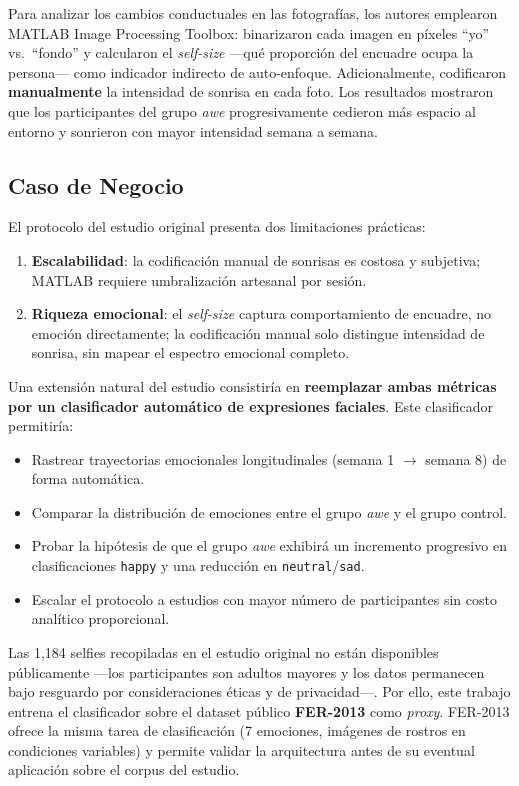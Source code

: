 \documentclass[12pt, a4paper]{article}
\begin{document}
Para analizar los cambios conductuales en las fotografías, los autores emplearon MATLAB Image
Processing Toolbox: binarizaron cada imagen en píxeles ``yo'' vs.\ ``fondo'' y calcularon el
\textit{self-size} —qué proporción del encuadre ocupa la persona— como indicador indirecto de
auto-enfoque. Adicionalmente, codificaron \textbf{manualmente} la intensidad de sonrisa en cada
foto. Los resultados mostraron que los participantes del grupo \textit{awe} progresivamente
cedieron más espacio al entorno y sonrieron con mayor intensidad semana a semana.

\subsection{Caso de Negocio}

El protocolo del estudio original presenta dos limitaciones prácticas:

\begin{enumerate}
  \item \textbf{Escalabilidad}: la codificación manual de sonrisas es costosa y subjetiva;
        MATLAB requiere umbralización artesanal por sesión.
  \item \textbf{Riqueza emocional}: el \textit{self-size} captura comportamiento de encuadre,
        no emoción directamente; la codificación manual solo distingue intensidad de sonrisa,
        sin mapear el espectro emocional completo.
\end{enumerate}

Una extensión natural del estudio consistiría en \textbf{reemplazar ambas métricas por un
clasificador automático de expresiones faciales}. Este clasificador permitiría:

\begin{itemize}
  \item Rastrear trayectorias emocionales longitudinales (semana 1 $\to$ semana 8) de forma automática.
  \item Comparar la distribución de emociones entre el grupo \textit{awe} y el grupo control.
  \item Probar la hipótesis de que el grupo \textit{awe} exhibirá un incremento progresivo en
        clasificaciones \texttt{happy} y una reducción en \texttt{neutral}/\texttt{sad}.
  \item Escalar el protocolo a estudios con mayor número de participantes sin costo analítico proporcional.
\end{itemize}

Las 1,184 selfies recopiladas en el estudio original no están disponibles públicamente —los
participantes son adultos mayores y los datos permanecen bajo resguardo por consideraciones
éticas y de privacidad—. Por ello, este trabajo entrena el clasificador sobre el dataset público
\textbf{FER-2013} como \textit{proxy}. FER-2013 ofrece la misma tarea de clasificación (7 emociones,
imágenes de rostros en condiciones variables) y permite validar la arquitectura antes de su
eventual aplicación sobre el corpus del estudio.
\end{document}
